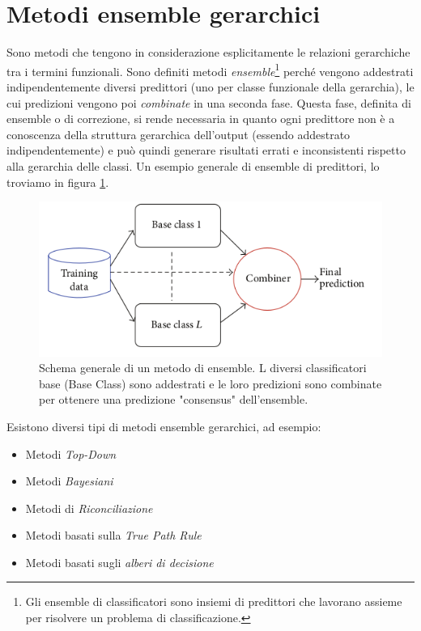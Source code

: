 \documentclass[12pt]{report}
\begin{document}
\section{Metodi ensemble gerarchici}
Sono metodi che tengono in considerazione esplicitamente le relazioni gerarchiche tra i termini funzionali. Sono definiti metodi \emph{ensemble}\footnote{\footnotesize{Gli ensemble di classificatori sono insiemi di predittori che lavorano assieme per risolvere un problema di classificazione.}} perché vengono addestrati indipendentemente diversi predittori (uno per classe funzionale della gerarchia), le cui predizioni vengono poi \emph{combinate} in una seconda fase. Questa fase, definita di ensemble o di correzione, si rende necessaria in quanto ogni predittore non è a conoscenza della struttura gerarchica dell'output (essendo addestrato indipendentemente) e può quindi generare risultati errati e inconsistenti rispetto alla gerarchia delle classi. Un esempio generale di ensemble di predittori, lo troviamo in figura \ref{ensembleex}.
\begin{figure}[h]
\centering
\includegraphics[scale=0.6]{./images/ensemble.png}
\caption{\footnotesize{Schema generale di un metodo di ensemble. L diversi classificatori base (Base Class) sono addestrati e le loro predizioni sono combinate per ottenere una predizione "consensus" dell'ensemble.}}
\label{ensembleex}
\end{figure}
\newline
\newline
Esistono diversi tipi di metodi ensemble gerarchici, ad esempio:
\begin{itemize}
\item Metodi \emph{Top-Down} \cite{TOPDOWN}
\item Metodi \emph{Bayesiani}\cite{BAYESIAN}
\item Metodi di \emph{Riconciliazione} \cite{reconcil}
\item Metodi basati sulla \emph{True Path Rule} \cite{TOPDOWN}
\item Metodi basati sugli \emph{alberi di decisione} \cite{decisionTree}
\end{itemize}
\end{document}
